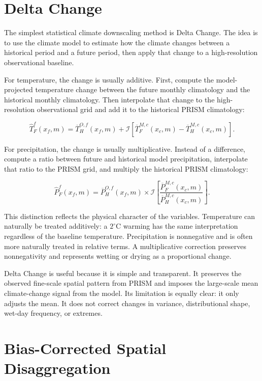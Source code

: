 \documentclass[11pt]{article}
\begin{document}
\section{Delta Change}

The simplest statistical climate downscaling method is Delta Change. The idea is to use the climate model to estimate how the climate changes between a historical period and a future period, then apply that change to a high-resolution observational baseline.

For temperature, the change is usually additive. First, compute the model-projected temperature change between the future monthly climatology and the historical monthly climatology. Then interpolate that change to the high-resolution observational grid and add it to the historical PRISM climatology:

\begin{equation}
\widehat{T}_{F}^{f}(x_f,m)
=
\overline{T}_{H}^{O,f}(x_f,m)
+
\mathcal{I}\left[
\overline{T}_{F}^{M,c}(x_c,m)-\overline{T}_{H}^{M,c}(x_c,m)
\right].
\end{equation}

For precipitation, the change is usually multiplicative. Instead of a difference, compute a ratio between future and historical model precipitation, interpolate that ratio to the PRISM grid, and multiply the historical PRISM climatology:

\begin{equation}
\widehat{P}_{F}^{f}(x_f,m)
=
\overline{P}_{H}^{O,f}(x_f,m)
\times
\mathcal{I}\left[
\frac{\overline{P}_{F}^{M,c}(x_c,m)}{\overline{P}_{H}^{M,c}(x_c,m)}
\right].
\end{equation}

This distinction reflects the physical character of the variables. Temperature can naturally be treated additively: a $2^\circ$C warming has the same interpretation regardless of the baseline temperature. Precipitation is nonnegative and is often more naturally treated in relative terms. A multiplicative correction preserves nonnegativity and represents wetting or drying as a proportional change.

Delta Change is useful because it is simple and transparent. It preserves the observed fine-scale spatial pattern from PRISM and imposes the large-scale mean climate-change signal from the model. Its limitation is equally clear: it only adjusts the mean. It does not correct changes in variance, distributional shape, wet-day frequency, or extremes.

\section{Bias-Corrected Spatial Disaggregation}
\end{document}
